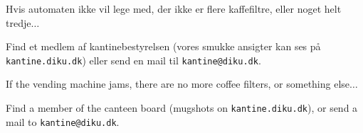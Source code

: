 \documentclass{article}
\begin{document}
\maketitle

\vspace{-0.5cm}


\vspace{-1.2cm}

\begin{center}

\LARGE

Hvis automaten ikke vil lege med, der ikke er flere kaffefiltre, eller noget
helt tredje$\ldots$\\

\Huge

Find et medlem af kantinebestyrelsen (vores smukke ansigter kan ses på
\texttt{kantine.diku.dk}) eller send en mail til \texttt{kantine@diku.dk}.

\end{center}

\english

\vspace{-0.3cm}


\vspace{-1.2cm}

\begin{center}

\LARGE

If the vending machine jams, there are no more coffee filters, or something
else$\ldots$\\

\Huge

Find a member of the canteen board (mugshots on \texttt{kantine.diku.dk}), or
send a mail to \texttt{kantine@diku.dk}.

\end{center}

\dansk

\underskriv
\end{document}
